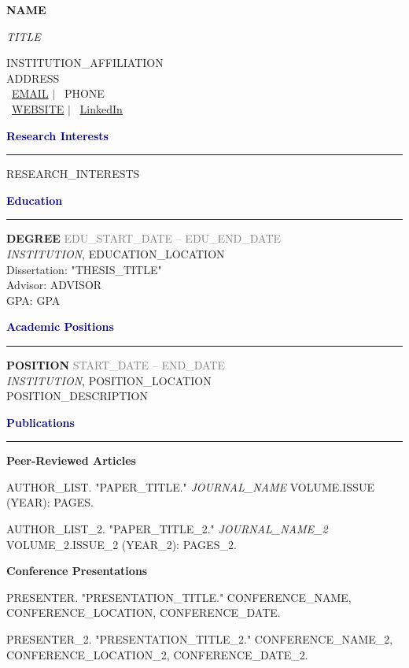 \documentclass[11pt,letterpaper]{article}
\newcommand{\name}[1]{\centerline{\Large\textbf{#1}}}
\newcommand{\jobtitle}[1]{\centerline{\large\textit{#1}}}
\newcommand{\contact}[1]{\centerline{#1}}
\newcommand{\cvsection}[1]{\textcolor{darkblue}{\textbf{\large #1}}\hrule\vspace{0.1in}}
\begin{document}
\name{{NAME}}
\jobtitle{{TITLE}}
\vspace{0.1in}
\contact{%
    {INSTITUTION\_AFFILIATION} \\
    {ADDRESS} \\
    \faEnvelope\ \href{mailto:{EMAIL}}{{EMAIL}} $|$ \faPhone\ {PHONE} \\
    \faGlobe\ \href{{WEBSITE}}{{WEBSITE}} $|$ \faLinkedin\ \href{{LINKEDIN}}{LinkedIn}
}
\vspace{0.2in}

\cvsection{Research Interests}
{RESEARCH\_INTERESTS}
\vspace{0.15in}

\cvsection{Education}

\textbf{{DEGREE}} \hfill \textcolor{gray}{{EDU\_START\_DATE} -- {EDU\_END\_DATE}} \\
\textit{{INSTITUTION}}, {EDUCATION\_LOCATION} \\
Dissertation: "{THESIS\_TITLE}" \\
Advisor: {ADVISOR} \\
GPA: {GPA}
\vspace{0.15in}

\cvsection{Academic Positions}

\textbf{{POSITION}} \hfill \textcolor{gray}{{START\_DATE} -- {END\_DATE}} \\
\textit{{INSTITUTION}}, {POSITION\_LOCATION} \\
{POSITION\_DESCRIPTION}
\vspace{0.15in}

\cvsection{Publications}

\textbf{Peer-Reviewed Articles}
\begin{etaremune}
    \item {AUTHOR\_LIST}. "{PAPER\_TITLE}." \textit{{JOURNAL\_NAME}} {VOLUME}.{ISSUE} ({YEAR}): {PAGES}.
    \item {AUTHOR\_LIST\_2}. "{PAPER\_TITLE\_2}." \textit{{JOURNAL\_NAME\_2}} {VOLUME\_2}.{ISSUE\_2} ({YEAR\_2}): {PAGES\_2}.
\end{etaremune}

\textbf{Conference Presentations}
\begin{etaremune}
    \item {PRESENTER}. "{PRESENTATION\_TITLE}." {CONFERENCE\_NAME}, {CONFERENCE\_LOCATION}, {CONFERENCE\_DATE}.
    \item {PRESENTER\_2}. "{PRESENTATION\_TITLE\_2}." {CONFERENCE\_NAME\_2}, {CONFERENCE\_LOCATION\_2}, {CONFERENCE\_DATE\_2}.
\end{etaremune}
\end{document}

